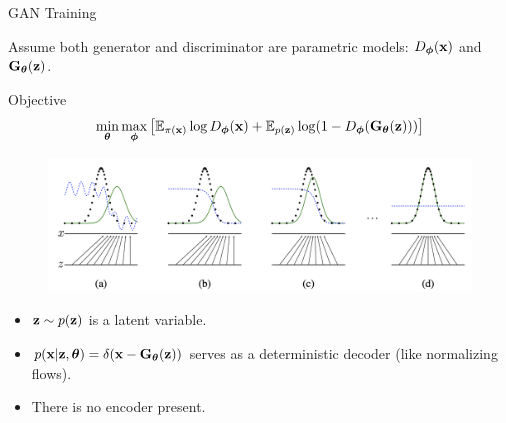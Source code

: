 \documentclass{beamer}
\begin{document}
\begin{frame}{GAN Training}

	Assume both generator and discriminator are parametric models: $D_{\boldsymbol{\phi}}(\mathbf{x})$ and $\mathbf{G}_{\boldsymbol{\theta}}(\mathbf{z})$.
	\begin{block}{Objective}
		\vspace{-0.7cm}
		\[
		\min_{\boldsymbol{\theta}} \max_{\boldsymbol{\phi}} \left[ \mathbb{E}_{\pi(\mathbf{x})} \log D_{\boldsymbol{\phi}}(\mathbf{x}) + \mathbb{E}_{p(\mathbf{z})} \log (1 - D_{\boldsymbol{\phi}}(\mathbf{G}_{\boldsymbol{\theta}}(\mathbf{z}))) \right]
		\]
		\vspace{-0.7cm}
	\end{block}
	\eqpause
	\begin{figure}
		\centering
		\includegraphics[width=1.0\linewidth]{figs/gan_1}
	\end{figure}
	\vspace{-0.5cm}
	\eqpause
	\begin{itemize}
		\item $\mathbf{z} \sim p(\mathbf{z})$ is a latent variable.
		\item $p(\mathbf{x} | \mathbf{z}, \boldsymbol{\theta}) = \delta(\mathbf{x} - \mathbf{G}_{\boldsymbol{\theta}}(\mathbf{z}))$ serves as a deterministic decoder ({\color{gray}like normalizing flows}).
		\item There is no encoder present.
	\end{itemize}
\end{frame}
\end{document}
